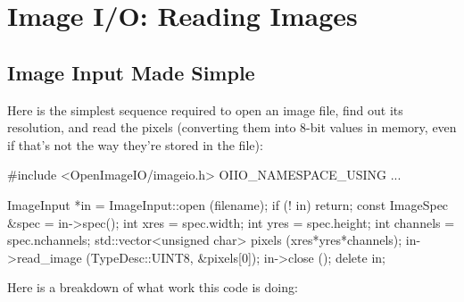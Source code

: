 \chapter{Image I/O: Reading Images}
\label{chap:imageinput}


\section{Image Input Made Simple}
\label{sec:imageinput:simple}

Here is the simplest sequence required to open an image file, find
out its resolution, and read the pixels (converting them into
8-bit values in memory, even if that's not the way they're stored in the file):

\begin{code}
        #include <OpenImageIO/imageio.h>
        OIIO_NAMESPACE_USING
        ...

        ImageInput *in = ImageInput::open (filename);
        if (! in)
            return;
        const ImageSpec &spec = in->spec();
        int xres = spec.width;
        int yres = spec.height;
        int channels = spec.nchannels;
        std::vector<unsigned char> pixels (xres*yres*channels);
        in->read_image (TypeDesc::UINT8, &pixels[0]);
        in->close ();
        delete in;
\end{code}

\noindent Here is a breakdown of what work this code is doing:

